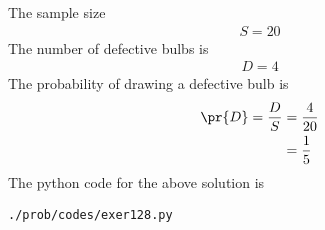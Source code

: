 The sample size 
\begin{align}
S=20
\end{align}
The number of defective bulbs is 
\begin{align}
D=4
\end{align}
The probability of drawing a defective bulb is 
\begin{align}
\pr{D} = \frac{D}{S} &= \frac{4}{20}
\\
&= \frac{1}{5}
\end{align}
The python code for the above solution is
\begin{lstlisting}
./prob/codes/exer128.py
\end{lstlisting}
